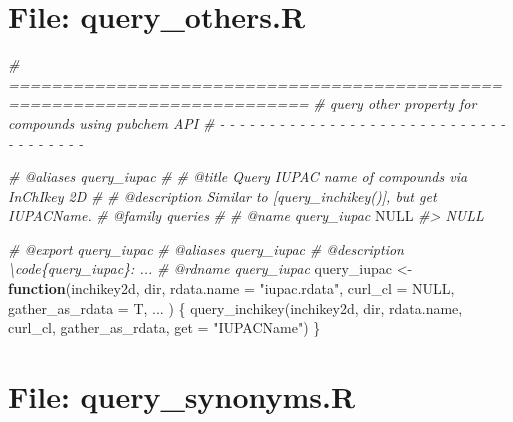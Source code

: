 \documentclass[
]{article}
\newenvironment{Shaded}{\begin{snugshade}}{\end{snugshade}}
\newcommand{\AttributeTok}[1]{\textcolor[rgb]{0.77,0.63,0.00}{#1}}
\newcommand{\CommentTok}[1]{\textcolor[rgb]{0.56,0.35,0.01}{\textit{#1}}}
\newcommand{\ConstantTok}[1]{\textcolor[rgb]{0.00,0.00,0.00}{#1}}
\newcommand{\ControlFlowTok}[1]{\textcolor[rgb]{0.13,0.29,0.53}{\textbf{#1}}}
\newcommand{\FunctionTok}[1]{\textcolor[rgb]{0.00,0.00,0.00}{#1}}
\newcommand{\NormalTok}[1]{#1}
\newcommand{\OtherTok}[1]{\textcolor[rgb]{0.56,0.35,0.01}{#1}}
\newcommand{\StringTok}[1]{\textcolor[rgb]{0.31,0.60,0.02}{#1}}
\begin{document}
\hypertarget{file-query_others.r}{%
\section{File: query\_others.R}\label{file-query_others.r}}

\begin{Shaded}
\begin{Highlighting}[]
\CommentTok{\# ==========================================================================}
\CommentTok{\# query other property for compounds using pubchem API}
\CommentTok{\# {-} {-} {-} {-} {-} {-} {-} {-} {-} {-} {-} {-} {-} {-} {-} {-} {-} {-} {-} {-} {-} {-} {-} {-} {-} {-} {-} {-} {-} {-} {-} {-} {-} {-} {-} {-} {-}}

\CommentTok{\#\textquotesingle{} @aliases query\_iupac}
\CommentTok{\#\textquotesingle{}}
\CommentTok{\#\textquotesingle{} @title Query IUPAC name of compounds via \textquotesingle{}InChIkey 2D\textquotesingle{}}
\CommentTok{\#\textquotesingle{}}
\CommentTok{\#\textquotesingle{} @description Similar to [query\_inchikey()], but get \textquotesingle{}IUPACName\textquotesingle{}.}
\CommentTok{\#\textquotesingle{} @family queries}
\CommentTok{\#\textquotesingle{}}
\CommentTok{\#\textquotesingle{} @name query\_iupac}
\ConstantTok{NULL}
\CommentTok{\#\textgreater{} NULL}

\CommentTok{\#\textquotesingle{} @export query\_iupac}
\CommentTok{\#\textquotesingle{} @aliases query\_iupac}
\CommentTok{\#\textquotesingle{} @description \textbackslash{}code\{query\_iupac\}: ...}
\CommentTok{\#\textquotesingle{} @rdname query\_iupac}
\NormalTok{query\_iupac }\OtherTok{\textless{}{-}}
  \ControlFlowTok{function}\NormalTok{(inchikey2d,}
\NormalTok{           dir,}
           \AttributeTok{rdata.name =} \StringTok{"iupac.rdata"}\NormalTok{,}
           \AttributeTok{curl\_cl =} \ConstantTok{NULL}\NormalTok{,}
           \AttributeTok{gather\_as\_rdata =}\NormalTok{ T,}
\NormalTok{           ...}
\NormalTok{           ) \{}
    \FunctionTok{query\_inchikey}\NormalTok{(inchikey2d, dir, rdata.name, curl\_cl, gather\_as\_rdata,}
                   \AttributeTok{get =} \StringTok{"IUPACName"}\NormalTok{)}
\NormalTok{\}}
\end{Highlighting}
\end{Shaded}

\hypertarget{file-query_synonyms.r}{%
\section{File: query\_synonyms.R}\label{file-query_synonyms.r}}
\end{document}
